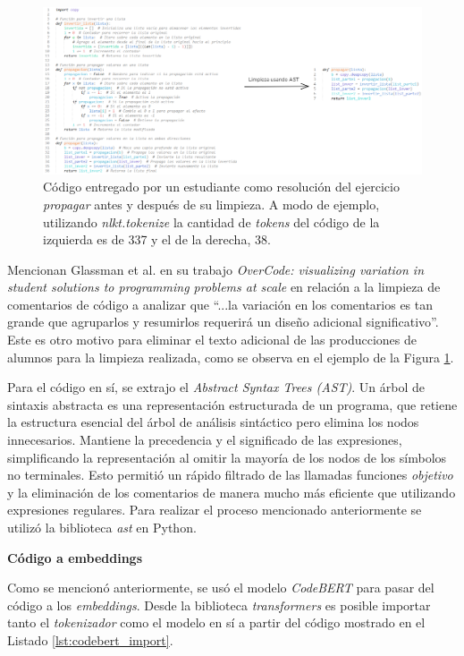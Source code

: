 \documentclass[11pt,a4paper,twoside,openany]{tesis}
\begin{document}
\begin{figure}[H]
    \centering
    \includegraphics[width=1\textwidth]{imagenes/ast.PNG}
    \caption{Código entregado por un estudiante como resolución del ejercicio \emph{propagar} antes y después de su limpieza. A modo de ejemplo, utilizando \emph{nlkt.tokenize} la cantidad de \emph{tokens} del código de la izquierda es de 337 y el de la derecha, 38.}
      \label{limpieza}
\end{figure}

Mencionan Glassman et al. en su trabajo \emph{OverCode: visualizing variation in student solutions to programming problems at scale} \cite{overcode} en relación a la limpieza de comentarios de código a analizar que ``...la variación en los comentarios es tan grande que agruparlos y resumirlos requerirá un diseño adicional significativo''. Este es otro motivo para eliminar el texto adicional de las producciones de alumnos para la limpieza realizada, como se observa en el ejemplo de la Figura \ref{limpieza}.

Para el código en sí, se extrajo el  \emph{Abstract Syntax Trees (AST)}. Un árbol de sintaxis abstracta es una representación estructurada de un programa, que retiene la estructura esencial del árbol de análisis sintáctico pero elimina los nodos innecesarios. Mantiene la precedencia y el significado de las expresiones, simplificando la representación al omitir la mayoría de los nodos de los símbolos no terminales\cite{cooper2011engineering}. Esto permitió un rápido filtrado de las llamadas funciones \emph{objetivo} y la eliminación de los comentarios de manera mucho más eficiente que utilizando expresiones regulares. Para realizar el proceso mencionado anteriormente se utilizó la biblioteca \emph{ast} \cite{ast} en Python.



\textbf{Código a embeddings}

Como se mencionó anteriormente, se usó el modelo \emph{CodeBERT} para pasar del código a los \emph{embeddings}. Desde la biblioteca \emph{transformers} \cite{roberta_model} es posible importar tanto el \emph{tokenizador} como el modelo en sí a partir del código mostrado en el Listado \ref{lst:codebert_import}.
\end{document}
